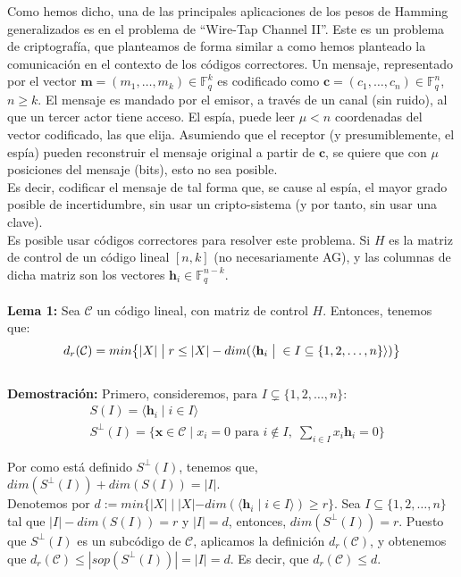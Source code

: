 \documentclass[11pt,spanish]{book}
\begin{document}
Como hemos dicho, una de las principales aplicaciones de los pesos de Hamming generalizados es en el problema de ``Wire-Tap Channel II''. Este es un problema de criptografía, que planteamos de forma similar a como hemos planteado la comunicación en el contexto de los códigos correctores. Un mensaje, representado por el vector $\mathbf{m}=(m_1,\ldots,m_k)\in\mathbb{F}_q^k$ es codificado como $\mathbf{c}=(c_1,\ldots,c_n)\in\mathbb{F}_q^n$, $n\geq k$. El mensaje es mandado por el emisor, a través de un canal (sin ruido), al que un tercer actor tiene acceso. El espía, puede leer $\mu < n$ coordenadas del vector codificado, las que elija. Asumiendo que el receptor (y presumiblemente, el espía) pueden reconstruir el mensaje original a partir de $\mathbf{c}$, se quiere que con $\mu$ posiciones del mensaje (bits), esto no sea posible. \\

Es decir, codificar el mensaje de tal forma que, se cause al espía, el mayor grado posible de incertidumbre, sin usar un cripto-sistema (y por tanto, sin usar una clave).\\

Es posible usar códigos correctores para resolver este problema. Si $H$ es la matriz de control de un código lineal $[n,k]$ (no necesariamente AG), y las columnas de dicha matriz son los vectores $\mathbf{h}_i\in \mathbb{F}_q^{n-k}$. \\
\\ \textbf{Lema 1: } Sea $\mathcal{C}$ un código lineal, con matriz de control $H$. Entonces, tenemos que:
$$d_r(\mathcal{C})=min\big{\{}|X|\;\big{|}\;r\leq |X|-dim(\langle \mathbf{h}_i\;\big{|}\; \in I\subseteq \{1,2,\ldots,n\}\rangle)\big{\}}$$
\\ \textbf{Demostración:}
Primero, consideremos, para $I\subsetneq\{1,2,\ldots,n\}$:
\begin{align*}
    &S(I) = \langle\mathbf{h}_i\;|\; i\in I\rangle\\
    &S^{\perp}(I)=\{\mathbf{x}\in\mathcal{C}\;|\;x_i=0\text{ para }i\notin I,\; \sum_{i\in I}x_i\mathbf{h}_i=0\}
\end{align*}

Por como está definido $S^{\perp}(I)$, tenemos que, $dim(S^{\perp}(I))+dim(S(I))=|I|$. \\

Denotemos por $d:=min\{|X|\;|\;|X|-dim(\langle \mathbf{h}_i\;|\; i\in I\rangle)\geq r\}$. Sea $I\subseteq\{1,2,\ldots,n\}$ tal que $|I|-dim(S(I))=r$ y $|I|=d$, entonces, $dim(S^{\perp}(I))=r$. Puesto que $S^{\perp}(I)$ es un subcódigo de $\mathcal{C}$, aplicamos la definición $d_r(\mathcal{C})$, y obtenemos que $d_r(\mathcal{C})\leq |sop(S^{\perp}(I))|=|I|=d$. Es decir, que $d_r(\mathcal{C})\leq d$.\\
\end{document}
